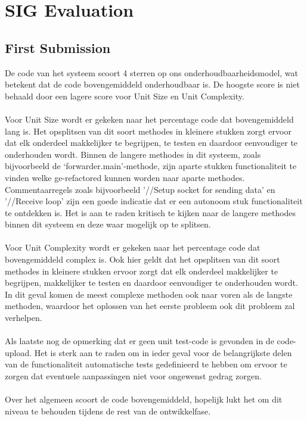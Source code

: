 \chapter{SIG Evaluation}
\pagebreak
\section{First Submission}
De code van het systeem scoort 4 sterren op ons onderhoudbaarheidsmodel, wat betekent dat de code bovengemiddeld onderhoudbaar is. De hoogste score is niet behaald door een lagere score voor Unit Size en Unit Complexity.\\\\
Voor Unit Size wordt er gekeken naar het percentage code dat bovengemiddeld lang is. Het opsplitsen van dit soort methodes in kleinere stukken zorgt ervoor dat elk onderdeel makkelijker te begrijpen, te testen en daardoor eenvoudiger te onderhouden wordt. Binnen de langere methodes in dit systeem, zoals bijvoorbeeld de ‘forwarder.main’-methode, zijn aparte stukken functionaliteit te vinden welke ge-refactored kunnen worden naar aparte methodes. Commentaarregels zoals bijvoorbeeld '//Setup socket for sending data' en '//Receive loop' zijn een goede indicatie dat er een autonoom stuk functionaliteit te ontdekken is. Het is aan te raden kritisch te kijken naar de langere methodes binnen dit systeem en deze waar mogelijk op te splitsen.\\\\
Voor Unit Complexity wordt er gekeken naar het percentage code dat bovengemiddeld complex is. Ook hier geldt dat het opsplitsen van dit soort methodes in kleinere stukken ervoor zorgt dat elk onderdeel makkelijker te begrijpen, makkelijker te testen en daardoor eenvoudiger te onderhouden wordt. In dit geval komen de meest complexe methoden ook naar voren als de langste methoden, waardoor het oplossen van het eerste probleem ook dit probleem zal verhelpen.\\\\
Als laatste nog de opmerking dat er geen unit test-code is gevonden in de code-upload. Het is sterk aan te raden om in ieder geval voor de belangrijkste delen van de functionaliteit automatische tests gedefinieerd te hebben om ervoor te zorgen dat eventuele aanpassingen niet voor ongewenst gedrag zorgen.\\\\
Over het algemeen scoort de code bovengemiddeld, hopelijk lukt het om dit niveau te behouden tijdens de rest van de ontwikkelfase. 

 